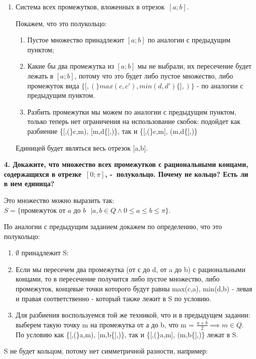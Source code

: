 \documentclass{article}
\begin{document}
\begin{enumerate}
\item Система всех промежутков, вложенных в отрезок $[a;b]$.

Покажем, что это полукольцо:
\begin{enumerate}
\item Пустое множество принадлежит $[a;b]$ по аналогии с предыдущим пунктом;

\item Какие бы два промежутка из $[a;b]$ мы не выбрали, их пересечение будет лежать в $[a;b]$, потому что это будет либо пустое множество, либо промежуток вида $\{[,(\}max(c,c'), min(d,d')\{],)\}$ - по аналогии с предыдущим пунктом.

\item Разбить промежутки мы можем по аналогии с предыдущим пунктом, только теперь нет ограничения на использование скобок: подойдет как разбиение \{[,(\}c,m), [m,d\{],)\}, так и \{[,(\}c,m], (m,d\{],)\}
\end{enumerate}

Единицей будет являться весь отрезок [a,b].
\end{enumerate}

\noindent \textbf{4. Докажите, что множество всех промежутков с рациональными концами, содержащихся в отрезке $[0;\pi]$, - полукольцо. Почему не кольцо? Есть ли в нем единица?}

Это множество можно выразить так: $S = \{\text{промежуток от $a$ до $b$ }| a,b \in Q \land 0 \le a \le b \le \pi\}$.

По аналогии с предыдущим заданием докажем по определению, что это полукольцо:

\begin{enumerate}
\item $\emptyset$ принадлежит S:

\item Если мы пересечем два промежутка (от с до d, от a до b) с рациональными концами, то в пересечение получится либо пустое множество, либо промежуток, концевые точки которого будут равны max(c,a), min(d,b) - левая и правая соответственно - который также лежит в S по условию.

\item Для разбиения воспользуемся той же техникой, что и в предыдущем задании:
выберем такую точку m на промежутка от а до b, что m = $\frac{a+b}{2} \implies m \in Q$. По условию как \{[,(\}a,m), [m,b\{],)\}, так и \{[,(\}a,m], (m,b\{],)\} лежат в S.
\end{enumerate}

S не будет кольцом, потому нет симметричной разности, например:
\end{document}
